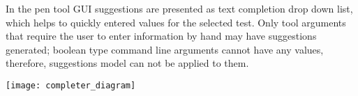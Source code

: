 In the pen tool GUI suggestions are presented as text completion drop down list, which helps to quickly entered values for the selected test. Only tool arguments that require the user to enter information by hand may have suggestions generated; boolean type command line arguments cannot have any values, therefore, suggestions model can not be applied to them. 

\begin{center}
	\begin{sideways}%
		\begin{minipage}{\textheight}
			\texttt{[image: completer\_diagram]}
			\label{fig:completer}
		\end{minipage}
	\end{sideways}
\end{center}

